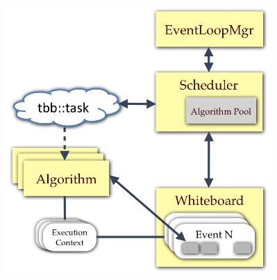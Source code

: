 \documentclass[9pt]{beamer}
\begin{document}
\begin{frame}
\begin{columns}
\begin{column}{0.7\textwidth}
    \end{column}
    \begin{column}{0.35\textwidth}
\begin{figure}
  \begin{center}
    \includegraphics[width=0.95\textwidth]{figs/gaudi-hive.png}
  \end{center}
\end{figure}
    \end{column}
  \end{columns}
\end{frame}
\end{document}
